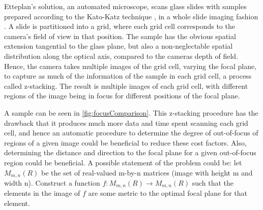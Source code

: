 \documentclass[a4paper,11pt]{article}
\begin{document}
Etteplan’s solution, an automated microscope, scans glass slides with samples prepared according to the Kato-Katz technique \cite{worldhealthorganization1991basic}, in a whole slide imaging fashion \cite{hanna2019whole}. A slide is partitioned into a grid, where each grid cell corresponds to the camera’s field of view in that position. The sample has the obvious spatial extension tangential to the glass plane, but also a non-neglectable spatial distribution along the optical axis, compared to the cameras depth of field. Hence, the camera takes multiple images of the grid cell, varying the focal plane, to capture as much of the information of the sample in each grid cell, a process called z-stacking. The result is multiple images of each grid cell, with different regions of the image being in focus for different positions of the focal plane.

A sample can be seen in \autoref{fig:focusComparison}. This z-stacking procedure has the drawback that it produces much more data and time spent scanning each grid cell, and hence an automatic procedure to determine the degree of out-of-focus of regions of a given image could be beneficial to reduce these cost factors. Also, determining the distance and direction to the focal plane for a given out-of-focus region could be beneficial. A possible statement of the problem could be: let $M_{m,n}(R)$ be the set of real-valued m-by-n matrices (image with height m and width n). Construct a function $f : M_{m,n}(R)\rightarrow M_{m,n}(R)$ such that the elements in the image of $f$ are some metric to the optimal focal plane for that element.
\end{document}
